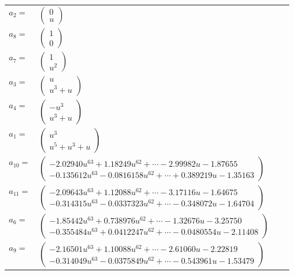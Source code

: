 \documentclass[1p]{elsarticle_modified}
\theoremstyle{definition}
\begin{document}
\begin{tabular}{m{7pt} m{180pt} m{7pt} m{180pt} }
\flushright $a_{2}=$&$\begin{pmatrix}0\\u\end{pmatrix}$ \\
\flushright $a_{8}=$&$\begin{pmatrix}1\\0\end{pmatrix}$ \\
\flushright $a_{7}=$&$\begin{pmatrix}1\\u^2\end{pmatrix}$ \\
\flushright $a_{3}=$&$\begin{pmatrix}u\\u^3+u\end{pmatrix}$ \\
\flushright $a_{4}=$&$\begin{pmatrix}- u^3\\u^3+u\end{pmatrix}$ \\
\flushright $a_{1}=$&$\begin{pmatrix}u^3\\u^5+u^3+u\end{pmatrix}$ \\
\flushright $a_{10}=$&$\begin{pmatrix}-2.02940 u^{63}+1.18249 u^{62}+\cdots-2.99982 u-1.87655\\-0.135612 u^{63}-0.0816158 u^{62}+\cdots+0.389219 u-1.35163\end{pmatrix}$ \\
\flushright $a_{11}=$&$\begin{pmatrix}-2.09643 u^{63}+1.12088 u^{62}+\cdots-3.17116 u-1.64675\\-0.314315 u^{63}-0.0337323 u^{62}+\cdots-0.348072 u-1.64704\end{pmatrix}$ \\
\flushright $a_{6}=$&$\begin{pmatrix}-1.85442 u^{63}+0.738976 u^{62}+\cdots-1.32676 u-3.25750\\-0.355484 u^{63}+0.0412247 u^{62}+\cdots-0.0480554 u-2.11408\end{pmatrix}$ \\
\flushright $a_{9}=$&$\begin{pmatrix}-2.16501 u^{63}+1.10088 u^{62}+\cdots-2.61060 u-2.22819\\-0.314049 u^{63}-0.0375849 u^{62}+\cdots-0.543961 u-1.53479\end{pmatrix}$ \\

\end{tabular}
\end{document}
